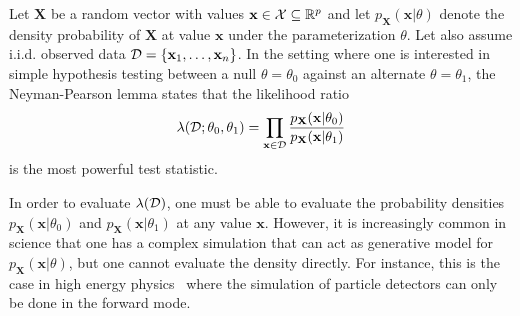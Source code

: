 \documentclass[12pt]{article}
\numberwithin{equation}{section}
\theoremstyle{plain}
\begin{document}
%

Let $\mathbf{X}$ be a random vector with values $\mathbf{x} \in {\cal X}
\subseteq \mathbb{R}^p$ and let $p_\mathbf{X}(\mathbf{x}|\theta)$ denote the
density probability of $\mathbf{X}$ at value $\mathbf{x}$ under the
parameterization $\theta$. Let also assume i.i.d. observed data ${\cal D} = \{
\mathbf{x}_1, \dots, \mathbf{x}_n \}$. In the setting where one is interested in
simple hypothesis testing between a null $\theta=\theta_0$ against an alternate
$\theta=\theta_1$, the Neyman-Pearson lemma states that the likelihood ratio
\begin{equation}\label{eqn:likelihood-ratio-test}
\lambda({\cal D}; \theta_0, \theta_1) = \prod_{\mathbf{x} \in {\cal D}} \frac{ p_\mathbf{X}(\mathbf{x}|\theta_0)}{ p_\mathbf{X}(\mathbf{x}|\theta_1)}
\end{equation}
is the most powerful test statistic.

In order to evaluate $\lambda({\cal D})$, one must be able to evaluate the probability
densities $p_\mathbf{X}(\mathbf{x}| \theta_0)$ and $p_\mathbf{X}(\mathbf{x}| \theta_1)$ at any value $\mathbf{x}$. However,
it is increasingly common in science that one has a complex simulation that can
act as generative model for $p_\mathbf{X}(\mathbf{x}|\theta)$, but one cannot
evaluate the density directly. For instance, this is the case in high energy
physics~\citep{Neal:2007zz} where the simulation of particle detectors can only
be done in the forward mode.
\end{document}
